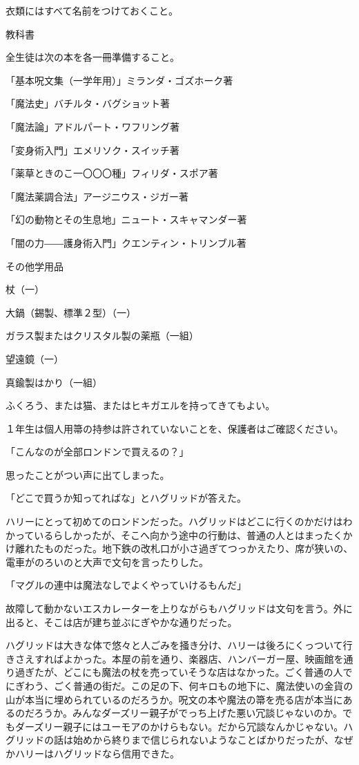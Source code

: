 \documentclass[10pt,a4paper]{article}
\begin{document}
\begin{CJK}{UTF8}{min}
衣類にはすべて名前をつけておくこと。



教科書

全生徒は次の本を各一冊準備すること。

「基本呪文集（一学年用）」ミランダ・ゴズホーク著

「魔法史」バチルタ・バグショット著

「魔法論」アドルパート・ワフリング著

「変身術入門」エメリソク・スイッチ著

「薬草ときのこ一〇〇〇種」フィリダ・スポア著

「魔法薬調合法」アージニウス・ジガー著

「幻の動物とその生息地」ニュート・スキャマンダー著

「闇の力――護身術入門」クエンティン・トリンブル著



その他学用品

杖（一）

大鍋（錫製、標準２型）（一）

ガラス製またはクリスタル製の薬瓶（一組）

望遠鏡（一）

真鍮製はかり（一組）



ふくろう、または猫、またはヒキガエルを持ってきてもよい。



１年生は個人用箒の持参は許されていないことを、保護者はご確認ください。







「こんなのが全部ロンドンで買えるの？」

思ったことがつい声に出てしまった。

「どこで買うか知ってればな」とハグリッドが答えた。



ハリーにとって初めてのロンドンだった。ハグリッドはどこに行くのかだけはわかっているらしかったが、そこへ向かう途中の行動は、普通の人とはまったくかけ離れたものだった。地下鉄の改札口が小さ過ぎてつっかえたり、席が狭いの、電車がのろいのと大声で文句を言ったりした。

「マグルの連中は魔法なしでよくやっていけるもんだ」

故障して動かないエスカレーターを上りながらもハグリッドは文句を言う。外に出ると、そこは店が建ち並ぶにぎやかな通りだった。

ハグリッドは大きな体で悠々と人ごみを掻き分け、ハリーは後ろにくっついて行きさえすればよかった。本屋の前を通り、楽器店、ハンバーガー屋、映画館を通り過ぎたが、どこにも魔法の杖を売っていそうな店はなかった。ごく普通の人でにぎわう、ごく普通の街だ。この足の下、何キロもの地下に、魔法使いの金貨の山が本当に埋められているのだろうか。呪文の本や魔法の箒を売る店が本当にあるのだろうか。みんなダーズリー親子がでっち上げた悪い冗談じゃないのか。でもダーズリー親子にはユーモアのかけらもない。だから冗談なんかじゃない。ハグリッドの話は始めから終りまで信じられないようなことばかりだったが、なぜかハリーはハグリッドなら信用できた。


\end{CJK}
\end{document}
